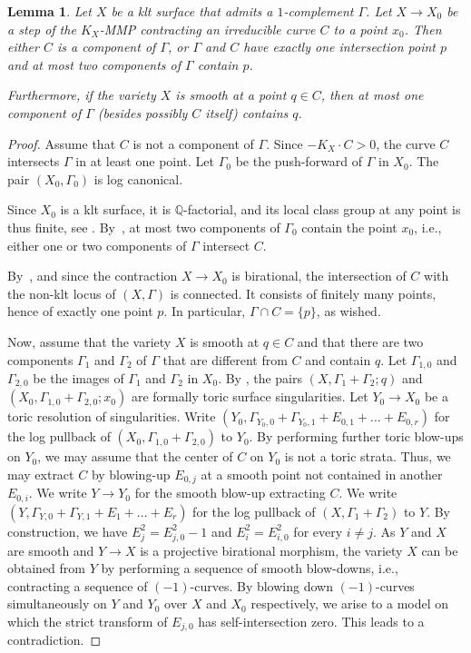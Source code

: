 \documentclass{amsart}
\newtheorem{lemma}[theorem]{Lemma}
\theoremstyle{definition}
\theoremstyle{remark}
\numberwithin{equation}{section}
\begin{document}
\begin{lemma}\label{lem:Gor-MMP}
Let $X$ be a klt surface that admits a $1$-complement
$\Gamma$.
Let $X\rightarrow X_0$ be a step of the $K_X$-MMP contracting an irreducible curve $C$ to a point $x_0$.
Then either $C$ is a component of $\Gamma$, or $\Gamma$ and $C$ have exactly one intersection point $p$ and at most two components of $\Gamma$ contain $p$.

Furthermore, if the variety $X$ is smooth at a point $q\in C$, then at most one component of $\Gamma$ (besides possibly $C$ itself) contains $q$.
\end{lemma}

\begin{proof}
Assume that $C$ is not a component of $\Gamma$. Since $-K_X\cdot C > 0$, the curve $C$ intersects $\Gamma$ in at least one point.
Let $\Gamma_0$ be the push-forward of $\Gamma$ in $X_0$.
The pair $(X_0,\Gamma_0)$ is log canonical.

Since $X_0$ is a klt surface, it is $\mathbb{Q}$-factorial, and its local class group at any point is thus finite, see \cite[Remark 3.29]{MS21}.
By~\cite[Theorem 1.2]{MS21}, at most two components of $\Gamma_0$ contain the point $x_0$, i.e., either one or two components of $\Gamma$ intersect $C$.

By~\cite[Theorem 1.1]{FS20}, and since the contraction $X\to X_0$ is birational, the intersection of $C$ with the non-klt locus of $(X,\Gamma)$ is connected. It consists of finitely many points, hence of exactly one point $p$. In particular, $\Gamma\cap C=\{p\}$, as wished.

Now, assume that the variety $X$ is smooth at $q\in C$
and that there are two components $\Gamma_1$ and $\Gamma_2$ of $\Gamma$ that are different from $C$ and contain $q$.
Let $\Gamma_{1,0}$ and $\Gamma_{2,0}$ be the images of $\Gamma_1$ and $\Gamma_2$ in $X_0$.
By \cite[Theorem 1 and 2]{MS21}, the pairs $(X,\Gamma_1+\Gamma_2;q)$ and $(X_0,\Gamma_{1,0}+\Gamma_{2,0};x_0)$ are formally toric surface singularities.
Let $Y_0\rightarrow X_0$ be a toric resolution of singularities.
Write $(Y_0,\Gamma_{Y_0,0}+\Gamma_{Y_0,1}+E_{0,1}+\dots+E_{0,r})$ for the log pullback of $(X_0,\Gamma_{1,0}+\Gamma_{2,0})$ to $Y_0$.
By performing further toric blow-ups on $Y_0$, we may assume that the center of $C$ on $Y_0$ is not a toric strata.
Thus, we may extract $C$ by blowing-up $E_{0,j}$ at a smooth point not contained in another $E_{0,i}$. We write $Y\rightarrow Y_0$ for the smooth blow-up extracting $C$. 
We write $(Y,\Gamma_{Y,0}+\Gamma_{Y,1}+E_1+\dots+E_r)$ for the log pullback of $(X,\Gamma_1+\Gamma_2)$ to $Y$.
By construction, we have $E_j^2=E_{j,0}^2-1$ and $E_i^2=E_{i,0}^2$ for every $i\neq j$.
As $Y$ and $X$ are smooth
and $Y\rightarrow X$ is a projective birational morphism, the variety $X$ can be obtained from $Y$ by performing a sequence of smooth blow-downs, i.e., 
contracting a sequence of $(-1)$-curves.
By blowing down $(-1)$-curves simultaneously on $Y$ and $Y_0$ over $X$ and $X_0$ respectively, we arise to a model on which the strict transform of $E_{j,0}$ has self-intersection zero. This leads to a contradiction.
\end{proof}
\end{document}
